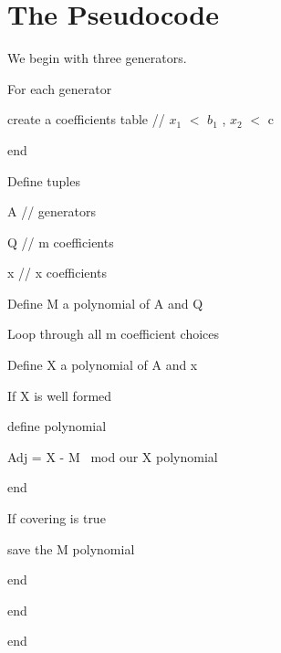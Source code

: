 \section{The Pseudocode}

We begin with three generators.

\begin{centering}
\begin{block}
For each generator

	create a coefficients table  // $x_1$ $<$ $b_1$ , $x_2$ $<$ c

end

Define tuples

	A // generators

	Q  //
m coefficients

	x  // x coefficients

Define M a polynomial of A and Q

Loop through all m coefficient choices

	Define X a polynomial of A and x

	If X is well formed

		define polynomial

			Adj = X - M \ mod our X polynomial

		end

		If covering is true

			save the M polynomial

		end

	end

end

\end{block}
\end{centering}
